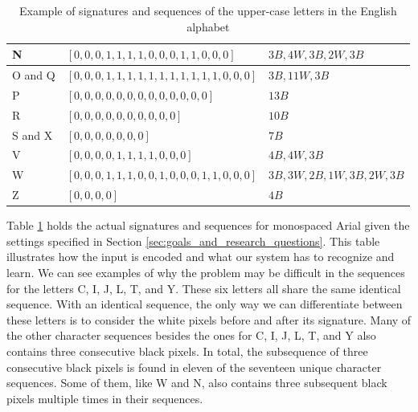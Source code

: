 \begin{table}[ht]
\begin{tabular}{|l|l|l|}
        N                     & \([0, 0, 0, 1, 1, 1, 1, 0, 0, 0, 1, 1, 0, 0, 0]\)       & \(3B, 4W, 3B, 2W, 3B\)         \\ \hline
        O and Q               & \([0, 0, 0, 1, 1, 1, 1, 1, 1, 1, 1, 1, 1, 1, 0, 0, 0]\) & \(3B, 11W, 3B\)                \\ \hline
        P                     & \([0, 0, 0, 0, 0, 0, 0, 0, 0, 0, 0, 0, 0]\)             & \(13B\)                        \\ \hline
        R                     & \([0, 0, 0, 0, 0, 0, 0, 0, 0, 0]\)                      & \(10B\)                        \\ \hline
        S and X               & \([0, 0, 0, 0, 0, 0, 0]\)                               & \(7B\)                         \\ \hline
        V                     & \([0, 0, 0, 0, 1, 1, 1, 1, 0, 0, 0]\)                   & \(4B, 4W, 3B\)                 \\ \hline
        W                     & \([0, 0, 0, 1, 1, 1, 0, 0, 1, 0, 0, 0, 1, 1, 0, 0, 0]\) & \(3B, 3W, 2B, 1W, 3B, 2W, 3B\) \\ \hline
        Z                     & \([0, 0, 0, 0]\)                                        & \(4B\)                         \\ \hline
    \end{tabular}
    \captionsetup{justification=centering}
    \caption{Example of signatures and sequences of the upper-case letters in the English alphabet}
    \label{table:signature_sequence_example}
\end{table}

Table \ref{table:signature_sequence_example} holds the actual signatures and sequences for monospaced Arial given the settings specified in Section \ref{sec:goals_and_research_questions}. This table illustrates how the input is encoded and what our system has to recognize and learn. We can see examples of why the problem may be difficult in the sequences for the letters C, I, J, L, T, and Y. These six letters all share the same identical sequence. With an identical sequence, the only way we can differentiate between these letters is to consider the white pixels before and after its signature. Many of the other character sequences besides the ones for C, I, J, L, T, and Y also contains three consecutive black pixels. In total, the subsequence of three consecutive black pixels is found in eleven of the seventeen unique character sequences. Some of them, like W and N, also contains three subsequent black pixels multiple times in their sequences. 


